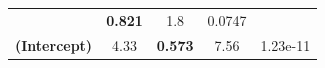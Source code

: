 \documentclass[]{book}
\begin{document}
\begin{longtable}[]{@{}ccccc@{}}
\begin{minipage}[t]{0.13\columnwidth}
\end{minipage} & \begin{minipage}[t]{0.16\columnwidth}\centering\strut
\textbf{0.821}\strut
\end{minipage} & \begin{minipage}[t]{0.12\columnwidth}\centering\strut
1.8\strut
\end{minipage} & \begin{minipage}[t]{0.12\columnwidth}\centering\strut
0.0747\strut
\end{minipage}\tabularnewline
\begin{minipage}[t]{0.27\columnwidth}\centering\strut
\textbf{(Intercept)}\strut
\end{minipage} & \begin{minipage}[t]{0.13\columnwidth}\centering\strut
4.33\strut
\end{minipage} & \begin{minipage}[t]{0.16\columnwidth}\centering\strut
\textbf{0.573}\strut
\end{minipage} & \begin{minipage}[t]{0.12\columnwidth}\centering\strut
7.56\strut
\end{minipage} & \begin{minipage}[t]{0.12\columnwidth}\centering\strut
1.23e-11\strut
\end{minipage}\tabularnewline
\bottomrule
\end{longtable}
\end{document}
